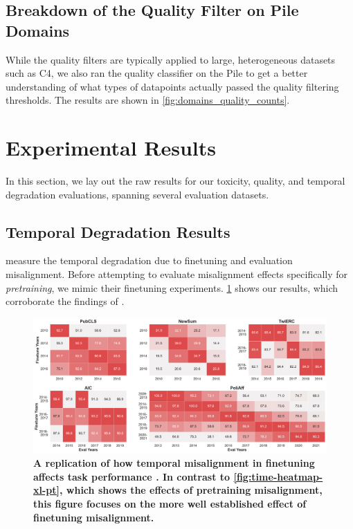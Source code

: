 \documentclass{article}
\begin{document}
\vspace{-3mm}
\subsection{Breakdown of the Quality Filter on Pile Domains}

While the quality filters are typically applied to large, heterogeneous datasets such as C4, we also ran the quality classifier on the Pile to get a better understanding of what types of datapoints actually passed the quality filtering thresholds. The results are shown in \cref{fig:domains_quality_counts}.


\clearpage
\vspace{-3mm}
\section{Experimental Results}
\label{sec:app-exp-results}

In this section, we lay out the raw results for our toxicity, quality, and temporal degradation evaluations, spanning several evaluation datasets.

\vspace{-3mm}
\subsection{Temporal Degradation Results}
\label{app:time-results}

\citet{luu2021time} measure the temporal degradation due to finetuning and evaluation misalignment.
Before attempting to evaluate misalignment effects specifically for \emph{pretraining}, we mimic their finetuning experiments.
\cref{fig:time-heatmap-xl-ft} shows our results, which corroborate the findings of \citep{luu2021time}.

\begin{figure}[ht]
    \centering
    \includegraphics[width=0.99\linewidth]{fables/time/xl_time_ft_heatmap.pdf}
    \caption{
    \small
    \textbf{A replication of how temporal misalignment in finetuning affects task performance \citep{luu2021time}. In contrast to \cref{fig:time-heatmap-xl-pt}, which shows the effects of pretraining misalignment, this figure focuses on the more well established effect of finetuning misalignment.}\\
    }
    \vspace{-3mm}
    \label{fig:time-heatmap-xl-ft}
\end{figure}
\end{document}
